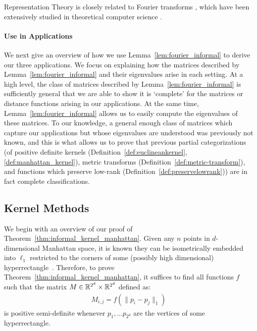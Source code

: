 Representation Theory is closely related to Fourier transforms \cite{t10}, which have been extensively studied in theoretical computer science \cite{hikp12a,hikp12b,ikp14,ik14,m15,ps15,ckps16,k16,k17,nsw19,jls20,cm21}.

\paragraph{Use in Applications}


We next give an overview of how we use Lemma~\ref{lem:fourier_informal} to derive our three applications. We focus on explaining how the matrices described by Lemma~\ref{lem:fourier_informal} and their eigenvalues arise in each setting. At a high level, the class of matrices described by Lemma~\ref{lem:fourier_informal} is sufficiently general that we are able to show it is `complete' for the matrices or distance functions arising in our applications. At the same time, Lemma~\ref{lem:fourier_informal} allows us to easily compute the eigenvalues of these matrices. To our knowledge, a general enough class of matrices which capture our applications but whose eigenvalues are understood was previously not known, and this is what allows us to prove that previous partial categorizations (of positive definite kernels (Definition~\ref{def:euclineankernel}, \ref{def:manhattan_kernel}), metric transforms (Definition~\ref{def:metric-transform}), and functions which preserve low-rank (Definition~\ref{def:preservelowrank})) are in fact complete classifications.


\subsection{Kernel Methods}\label{sec:tech_kernel}


We begin with an overview of our proof of Theorem~\ref{thm:informal_kernel_manhattan}. Given any $n$ points in $d$-dimensional Manhattan space, it is known they can be isometrically embedded into $\ell_1$ restricted to the corners of some (possibly high dimensional) hyperrectangle~\cite{dl09}. Therefore, to prove Theorem~\ref{thm:informal_kernel_manhattan}, it suffices to find all functions $f$ such that the matrix $M \in {\mathbb R}^{2^d} \times {\mathbb R}^{2^d}$ defined as:
 \begin{align*}
  M_{i,j} = f(\|p_i - p_j\|_1) 
 \end{align*}
  is positive semi-definite whenever $p_1, \ldots p_{2^d}$ are the vertices of some hyperrectangle.

